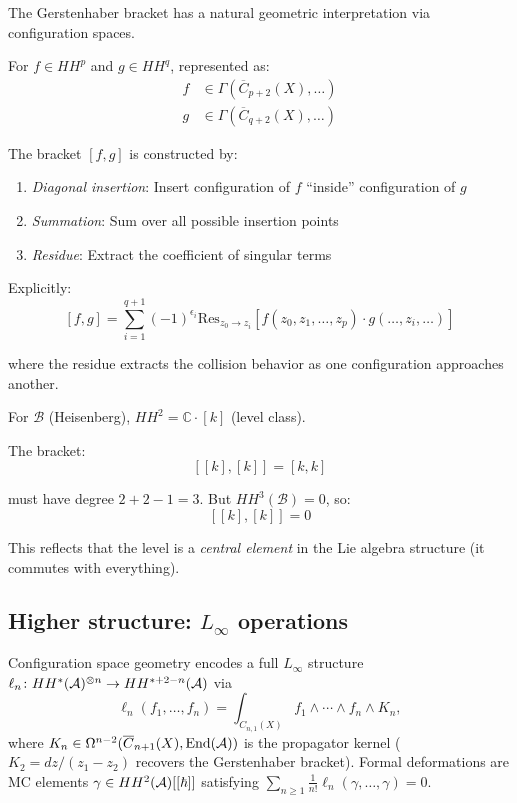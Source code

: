 \begin{construction}\label{const:gerstenhaber-bracket}
The Gerstenhaber bracket has a natural geometric interpretation via configuration spaces.

For $f \in HH^p$ and $g \in HH^q$, represented as:
\begin{align*}
f &\in \Gamma(\overline{C}_{p+2}(X), \ldots)\\
g &\in \Gamma(\overline{C}_{q+2}(X), \ldots)
\end{align*}

The bracket $[f, g]$ is constructed by:
\begin{enumerate}
\item \emph{Diagonal insertion}: Insert configuration of $f$ ``inside'' configuration of $g$
\item \emph{Summation}: Sum over all possible insertion points
\item \emph{Residue}: Extract the coefficient of singular terms
\end{enumerate}

Explicitly:
\[[f, g] = \sum_{i=1}^{q+1} (-1)^{\epsilon_i} \text{Res}_{z_0 \to z_i}\left[f(z_0, z_1, \ldots, z_p) 
\cdot g(\ldots, z_i, \ldots)\right]\]

where the residue extracts the collision behavior as one configuration approaches another.
\end{construction}

\begin{example}\label{ex:gerstenhaber-heisenberg}
For $\mathcal{B}$ (Heisenberg), $HH^2 = \mathbb{C} \cdot [k]$ (level class).

The bracket:
\[[[k], [k]] = [k, k]\]

must have degree $2 + 2 - 1 = 3$. But $HH^3(\mathcal{B}) = 0$, so:
\[[[k], [k]] = 0\]

This reflects that the level is a \emph{central element} in the Lie algebra structure
(it commutes with everything).
\end{example}

\subsection{\texorpdfstring{Higher structure: $L_\infty$ operations}{Higher structure: L-infinity operations}}

\begin{remark}\label{rem:L-infty-structure}
Configuration space geometry encodes a full $L_\infty$ structure
$\ell_n\colon HH^*(\mathcal{A})^{\otimes n} \to HH^{*+2-n}(\mathcal{A})$ via
\[
\ell_n(f_1, \ldots, f_n) = \int_{C_{n,1}(X)} f_1 \wedge \cdots \wedge f_n
\wedge K_n,
\]
where $K_n \in \Omega^{n-2}(\overline{C}_{n+1}(X), \mathrm{End}(\mathcal{A}))$
is the propagator kernel ($K_2 = dz/(z_1-z_2)$ recovers the Gerstenhaber
bracket).  Formal deformations are MC elements
$\gamma \in HH^2(\mathcal{A})[[\hbar]]$ satisfying
$\sum_{n \geq 1} \frac{1}{n!}\ell_n(\gamma, \ldots, \gamma) = 0$.
\end{remark}


